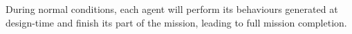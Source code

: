 \documentclass[journal]{IEEEtran}
\theoremstyle{definition}
\begin{document}

During normal conditions, each agent will perform its behaviours generated at design-time and finish its part of the mission, leading to full mission completion.

 





\end{document}
